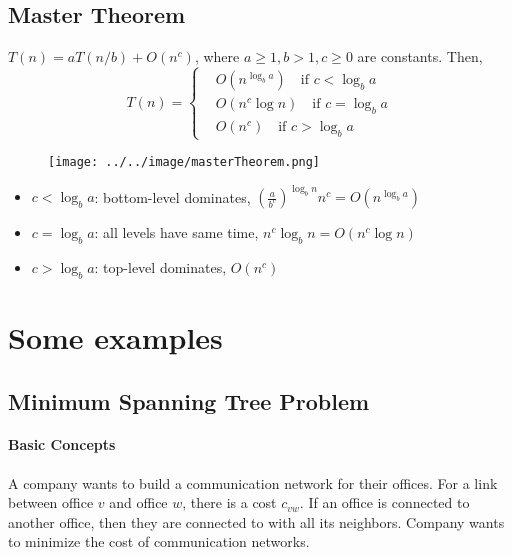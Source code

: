             \subsection{Master Theorem}
                \begin{theorem}
                    $T(n) = aT(n/b) + O(n^c)$, where $a \ge 1, b > 1, c \ge 0$ are constants. Then,
                    \begin{equation*}
                        T(n) = \begin{cases}
                            & O(n^{\log_b a}) \quad \text{if } c < \log_b a\\
                            & O(n^c \log n) \quad \text{if } c = \log_b a\\
                            & O(n^c) \quad \text{if } c > \log_b a
                        \end{cases}
                    \end{equation*}
                \end{theorem}

                \begin{figure}[H]
                    \centering
                    \texttt{[image: ../../image/masterTheorem.png]}
                    \label{fig:masterTheorem}
                \end{figure}

                \begin{itemize}
                    \item $c < \log_b a$: bottom-level dominates, $(\frac{a}{b^c})^{\log_b n} n^c = O(n^{\log_b a})$
                    \item $c = \log_b a$: all levels have same time, $n^c \log_b n = O(n^c \log n)$
                    \item $c > \log_b a$: top-level dominates, $O(n^c)$
                \end{itemize}

        \section{Some examples}
            \subsection{Minimum Spanning Tree Problem}
                \paragraph{Basic Concepts}
                    \begin{example}
                        A company wants to build a communication network for their offices. For a link between office $v$ and office $w$, there is a cost $c_{vw}$. If an office is connected to another office, then they are connected to with all its neighbors. Company wants to minimize the cost of communication networks.
                    \end{example}

